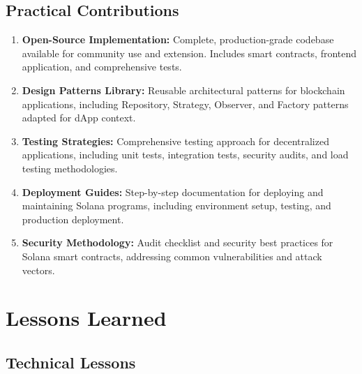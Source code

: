 \documentclass[a4paper,13pt,twoside]{report}
\theoremstyle{definition}
\begin{document}
\subsection{Practical Contributions}

\begin{enumerate}
    \item \textbf{Open-Source Implementation:} Complete, production-grade codebase available for community use and extension. Includes smart contracts, frontend application, and comprehensive tests.

    \item \textbf{Design Patterns Library:} Reusable architectural patterns for blockchain applications, including Repository, Strategy, Observer, and Factory patterns adapted for dApp context.

    \item \textbf{Testing Strategies:} Comprehensive testing approach for decentralized applications, including unit tests, integration tests, security audits, and load testing methodologies.

    \item \textbf{Deployment Guides:} Step-by-step documentation for deploying and maintaining Solana programs, including environment setup, testing, and production deployment.

    \item \textbf{Security Methodology:} Audit checklist and security best practices for Solana smart contracts, addressing common vulnerabilities and attack vectors.
\end{enumerate}

\section{Lessons Learned}

\subsection{Technical Lessons}
\end{document}
